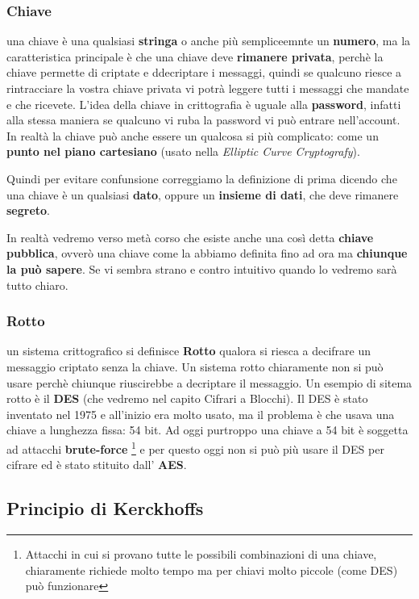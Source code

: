\documentclass{report}
\begin{document}
\subsubsection{Chiave} una chiave è una qualsiasi \textbf{stringa} o anche più sempliceemnte un \textbf{numero}, ma la caratteristica principale è che una chiave deve \textbf{rimanere privata}, perchè la chiave permette di criptate e ddecriptare i messaggi, quindi se qualcuno riesce a rintracciare la vostra chiave privata vi potrà leggere tutti i messaggi che mandate e che ricevete. L'idea della chiave in crittografia è uguale alla \textbf{password}, infatti alla stessa maniera se qualcuno vi ruba la password vi può entrare nell'account. In realtà la chiave può anche essere un qualcosa si più complicato: come un \textbf{punto nel piano cartesiano} (usato nella \textit{Elliptic Curve Cryptografy}). 

Quindi per evitare confunsione correggiamo la definizione di prima dicendo che una chiave è un qualsiasi \textbf{dato}, oppure un \textbf{insieme di dati},  che deve rimanere \textbf{segreto}.

In realtà vedremo verso metà corso che esiste anche una così detta \textbf{chiave pubblica}, ovverò una chiave come la abbiamo definita fino ad ora ma \textbf{chiunque la può sapere}. Se vi sembra strano e contro intuitivo quando lo vedremo sarà tutto chiaro.

\subsubsection{Rotto} un sistema crittografico si definisce \textbf{Rotto} qualora si riesca a decifrare un messaggio criptato senza la chiave. Un sistema rotto chiaramente non si può usare perchè chiunque riuscirebbe a decriptare il messaggio. Un esempio di sitema rotto è il \textbf{DES} (che vedremo nel capito Cifrari a Blocchi). Il DES è stato inventato nel 1975 e all'inizio era molto usato, ma il problema è che usava una chiave a lunghezza fissa: 54 bit. Ad oggi purtroppo una chiave a 54 bit è soggetta ad attacchi \textbf{brute-force} \footnote{Attacchi in cui si provano tutte le possibili combinazioni di una chiave, chiaramente richiede molto tempo ma per chiavi molto piccole (come DES) può funzionare} e per questo oggi non si può più usare il DES per cifrare ed è stato stituito dall' \textbf{AES}.





\newpage

\subsection{Principio di Kerckhoffs}
\end{document}

